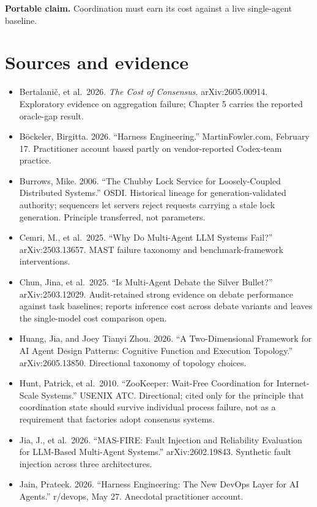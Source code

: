 \textbf{Portable claim.} Coordination must earn its cost against a live single-agent baseline.

\section*{Sources and evidence}

\begin{itemize}
\tightlist
\item
  Bertalani\v{c}, et al.~2026. \emph{The Cost of Consensus}. arXiv:2605.00914. Exploratory evidence on aggregation failure; Chapter 5 carries the reported oracle-gap result.
\item
  Böckeler, Birgitta. 2026. ``Harness Engineering.'' MartinFowler.com, February 17. Practitioner account based partly on vendor-reported Codex-team practice.
\item
  Burrows, Mike. 2006. ``The Chubby Lock Service for Loosely-Coupled Distributed Systems.'' OSDI. Historical lineage for generation-validated authority; sequencers let servers reject requests carrying a stale lock generation. Principle transferred, not parameters.
\item
  Cemri, M., et al.~2025. ``Why Do Multi-Agent LLM Systems Fail?'' arXiv:2503.13657. MAST failure taxonomy and benchmark-framework interventions.
\item
  Chun, Jina, et al.~2025. ``Is Multi-Agent Debate the Silver Bullet?'' arXiv:2503.12029. Audit-retained strong evidence on debate performance against task baselines; reports inference cost across debate variants and leaves the single-model cost comparison open.
\item
  Huang, Jia, and Joey Tianyi Zhou. 2026. ``A Two-Dimensional Framework for AI Agent Design Patterns: Cognitive Function and Execution Topology.'' arXiv:2605.13850. Directional taxonomy of topology choices.
\item
  Hunt, Patrick, et al.~2010. ``ZooKeeper: Wait-Free Coordination for Internet-Scale Systems.'' USENIX ATC. Directional; cited only for the principle that coordination state should survive individual process failure, not as a requirement that factories adopt consensus systems.
\item
  Jia, J., et al.~2026. ``MAS-FIRE: Fault Injection and Reliability Evaluation for LLM-Based Multi-Agent Systems.'' arXiv:2602.19843. Synthetic fault injection across three architectures.
\item
  Jain, Prateek. 2026. ``Harness Engineering: The New DevOps Layer for AI Agents.'' r/devops, May 27. Anecdotal practitioner account.

\end{itemize}
